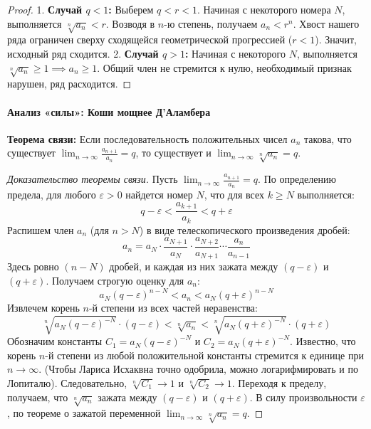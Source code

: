 \begin{proof}
1. \textbf{Случай $q < 1$:} Выберем $q < r < 1$. Начиная с некоторого номера $N$, выполняется $\sqrt[n]{a_n} < r$. Возводя в $n$-ю степень, получаем $a_n < r^n$. Хвост нашего ряда ограничен сверху сходящейся геометрической прогрессией ($r < 1$). Значит, исходный ряд сходится.
2. \textbf{Случай $q > 1$:} Начиная с некоторого $N$, выполняется $\sqrt[n]{a_n} \ge 1 \implies a_n \ge 1$. Общий член не стремится к нулю, необходимый признак нарушен, ряд расходится.
\end{proof}

\paragraph{Анализ «силы»: Коши мощнее Д'Аламбера}
\textbf{Теорема связи:} Если последовательность положительных чисел $a_n$ такова, что существует $\lim_{n \to \infty} \frac{a_{n+1}}{a_n} = q$, то существует и $\lim_{n \to \infty} \sqrt[n]{a_n} = q$.

\begin{proof}[Доказательство теоремы связи]
Пусть $\lim_{n \to \infty} \frac{a_{n+1}}{a_n} = q$. По определению предела, для любого $\varepsilon > 0$ найдется номер $N$, что для всех $k \ge N$ выполняется:
$$ q - \varepsilon < \frac{a_{k+1}}{a_k} < q + \varepsilon $$
Распишем член $a_n$ (для $n > N$) в виде телескопического произведения дробей:
$$ a_n = a_N \cdot \frac{a_{N+1}}{a_N} \cdot \frac{a_{N+2}}{a_{N+1}} \cdots \frac{a_n}{a_{n-1}} $$
Здесь ровно $(n-N)$ дробей, и каждая из них зажата между $(q - \varepsilon)$ и $(q + \varepsilon)$. Получаем строгую оценку для $a_n$:
$$ a_N (q - \varepsilon)^{n-N} < a_n < a_N (q + \varepsilon)^{n-N} $$
Извлечем корень $n$-й степени из всех частей неравенства:
$$ \sqrt[n]{a_N (q - \varepsilon)^{-N}} \cdot (q - \varepsilon) < \sqrt[n]{a_n} < \sqrt[n]{a_N (q + \varepsilon)^{-N}} \cdot (q + \varepsilon) $$
Обозначим константы $C_1 = a_N (q - \varepsilon)^{-N}$ и $C_2 = a_N (q + \varepsilon)^{-N}$. Известно, что корень $n$-й степени из любой положительной константы стремится к единице при $n \to \infty$. (Чтобы Лариса Исхаквна точно одобрила, можно логарифмировать и по Лопиталю). Следовательно, $\sqrt[n]{C_1} \to 1$ и $\sqrt[n]{C_2} \to 1$. 
Переходя к пределу, получаем, что $\sqrt[n]{a_n}$ зажата между $(q - \varepsilon)$ и $(q + \varepsilon)$. В силу произвольности $\varepsilon$, по теореме о зажатой переменной $\lim_{n \to \infty} \sqrt[n]{a_n} = q$.
\end{proof}

